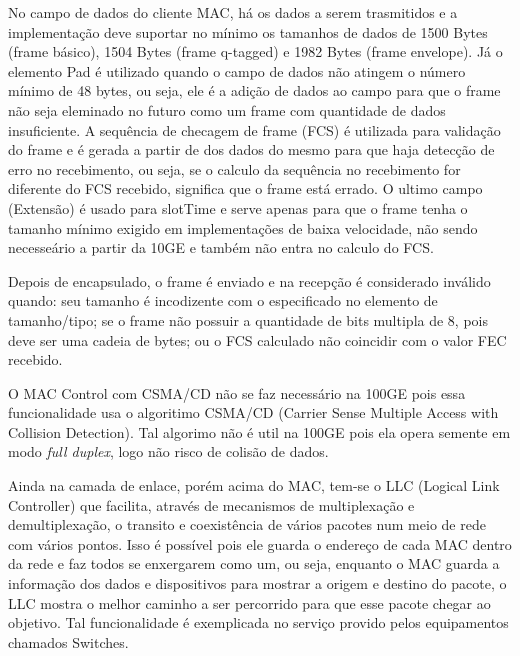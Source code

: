 \documentclass[a4paper,12pt]{article}
\begin{document}
No campo de dados do cliente MAC, há os dados a serem trasmitidos e a implementação deve suportar no mínimo os tamanhos de dados de 1500 Bytes (frame básico), 1504 Bytes (frame q-tagged) e 1982 Bytes (frame envelope). Já o elemento Pad é utilizado quando o campo de dados não atingem o número mínimo de 48 bytes, ou seja, ele é a adição de dados ao campo para que o frame não seja eleminado no futuro como um frame com quantidade de dados insuficiente. A sequência de checagem de frame (FCS) é utilizada para validação do frame e é gerada a partir de dos dados do mesmo para que haja detecção de erro no recebimento, ou seja, se o calculo da sequência no recebimento for diferente do FCS recebido, significa que o frame está errado. O ultimo campo (Extensão) é usado para slotTime e serve apenas para que o frame tenha o tamanho mínimo exigido em implementações de baixa velocidade, não sendo necesseário a partir da 10GE e também não entra no calculo do FCS.

Depois de encapsulado, o frame é enviado e na recepção é considerado inválido quando: seu tamanho é incodizente com o especificado no elemento de tamanho/tipo; se o frame não possuir a quantidade de bits multipla de 8, pois deve ser uma cadeia de bytes; ou o FCS calculado não coincidir com o valor FEC recebido.

O MAC Control com CSMA/CD não se faz necessário na 100GE pois essa funcionalidade usa o algoritimo CSMA/CD (Carrier Sense Multiple Access with Collision Detection). Tal algorimo não é util na 100GE pois ela opera semente em modo \textit{full duplex}, logo não risco de colisão de dados.

Ainda na camada de enlace, porém acima do MAC, tem-se o LLC (Logical Link Controller) que facilita, através de mecanismos de multiplexação e demultiplexação, o transito e coexistência de vários pacotes num meio de rede com vários pontos. Isso é possível pois ele guarda o endereço de cada MAC dentro da rede e faz todos se enxergarem como um, ou seja, enquanto o MAC guarda a informação dos dados e dispositivos para mostrar a origem e destino do pacote, o LLC mostra o melhor caminho a ser percorrido para que esse pacote chegar ao objetivo. Tal funcionalidade é exemplicada no serviço provido pelos equipamentos chamados Switches.
\end{document}
